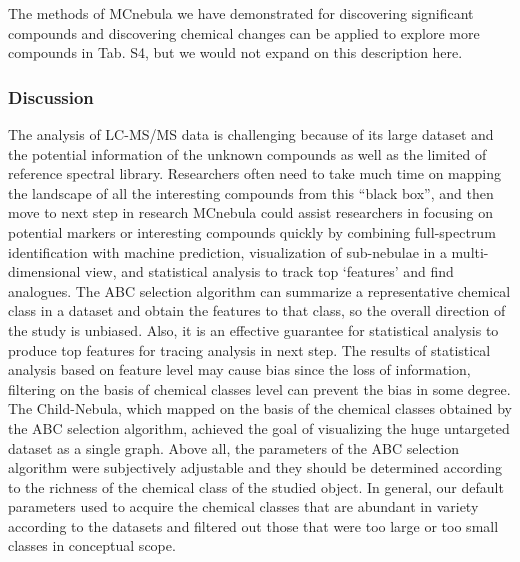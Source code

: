 \documentclass[
]{article}
\begin{document}
The methods of MCnebula we have demonstrated for discovering significant
compounds and discovering chemical changes can be applied to explore
more compounds in Tab. S4, but we would not expand on this description
here.

\hypertarget{discussion}{%
\subsubsection{Discussion}\label{discussion}}

The analysis of LC-MS/MS data is challenging because of its large
dataset and the potential information of the unknown compounds as well
as the limited of reference spectral library. Researchers often need to
take much time on mapping the landscape of all the interesting compounds
from this ``black box'', and then move to next step in research MCnebula
could assist researchers in focusing on potential markers or interesting
compounds quickly by combining full-spectrum identification with machine
prediction, visualization of sub-nebulae in a multi-dimensional view,
and statistical analysis to track top `features' and find analogues. The
ABC selection algorithm can summarize a representative chemical class in
a dataset and obtain the features to that class, so the overall
direction of the study is unbiased. Also, it is an effective guarantee
for statistical analysis to produce top features for tracing analysis in
next step. The results of statistical analysis based on feature level
may cause bias since the loss of information, filtering on the basis of
chemical classes level can prevent the bias in some degree. The
Child-Nebula, which mapped on the basis of the chemical classes obtained
by the ABC selection algorithm, achieved the goal of visualizing the
huge untargeted dataset as a single graph. Above all, the parameters of
the ABC selection algorithm were subjectively adjustable and they should
be determined according to the richness of the chemical class of the
studied object. In general, our default parameters used to acquire the
chemical classes that are abundant in variety according to the datasets
and filtered out those that were too large or too small classes in
conceptual scope.
\end{document}
